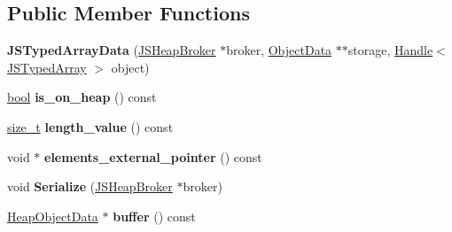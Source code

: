 \subsection*{Public Member Functions}
\begin{DoxyCompactItemize}
\item 
\mbox{\label{classv8_1_1internal_1_1compiler_1_1JSTypedArrayData_a7adc2891011ca5e2858327dac62ad848}} 
{\bfseries J\+S\+Typed\+Array\+Data} (\mbox{\hyperlink{classv8_1_1internal_1_1compiler_1_1JSHeapBroker}{J\+S\+Heap\+Broker}} $\ast$broker, \mbox{\hyperlink{classv8_1_1internal_1_1compiler_1_1ObjectData}{Object\+Data}} $\ast$$\ast$storage, \mbox{\hyperlink{classv8_1_1internal_1_1Handle}{Handle}}$<$ \mbox{\hyperlink{classv8_1_1internal_1_1JSTypedArray}{J\+S\+Typed\+Array}} $>$ object)
\item 
\mbox{\label{classv8_1_1internal_1_1compiler_1_1JSTypedArrayData_a2142f8fd4cc3e556dec320fc9d776865}} 
\mbox{\hyperlink{classbool}{bool}} {\bfseries is\+\_\+on\+\_\+heap} () const
\item 
\mbox{\label{classv8_1_1internal_1_1compiler_1_1JSTypedArrayData_a0dcf29871b0d9a02ee00c1ebb0ab3834}} 
\mbox{\hyperlink{classsize__t}{size\+\_\+t}} {\bfseries length\+\_\+value} () const
\item 
\mbox{\label{classv8_1_1internal_1_1compiler_1_1JSTypedArrayData_af55ae86c06e29303f085fc9d51d2c1d8}} 
void $\ast$ {\bfseries elements\+\_\+external\+\_\+pointer} () const
\item 
\mbox{\label{classv8_1_1internal_1_1compiler_1_1JSTypedArrayData_a6efbea9d7d0a0bbbdf59c432a69735db}} 
void {\bfseries Serialize} (\mbox{\hyperlink{classv8_1_1internal_1_1compiler_1_1JSHeapBroker}{J\+S\+Heap\+Broker}} $\ast$broker)
\item 
\mbox{\label{classv8_1_1internal_1_1compiler_1_1JSTypedArrayData_abe856b5c7b9b2c1e43a3f8dbf135280c}} 
\mbox{\hyperlink{classv8_1_1internal_1_1compiler_1_1HeapObjectData}{Heap\+Object\+Data}} $\ast$ {\bfseries buffer} () const
\end{DoxyCompactItemize}
